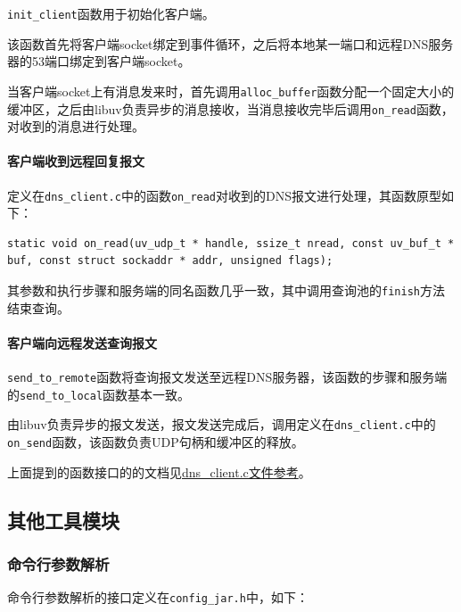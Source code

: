 \documentclass[lang=cn,11pt,a4paper,cite=authornum]{paper}
\begin{document}
\texttt{init_client}函数用于初始化客户端。

该函数首先将客户端socket绑定到事件循环，之后将本地某一端口和远程DNS服务器的53端口绑定到客户端socket。

当客户端socket上有消息发来时，首先调用\texttt{alloc_buffer}函数分配一个固定大小的缓冲区，之后由libuv负责异步的消息接收，当消息接收完毕后调用\texttt{on_read}函数，对收到的消息进行处理。

\paragraph{客户端收到远程回复报文}

定义在\texttt{dns_client.c}中的函数\texttt{on_read}对收到的DNS报文进行处理，其函数原型如下：

\begin{code}
\begin{verbatim}
static void on_read(uv_udp_t * handle, ssize_t nread, const uv_buf_t * buf, const struct sockaddr * addr, unsigned flags);
\end{verbatim}
\end{code}

其参数和执行步骤和服务端的同名函数几乎一致，其中调用查询池的\texttt{finish}方法结束查询。

\paragraph{客户端向远程发送查询报文}

\texttt{send_to_remote}函数将查询报文发送至远程DNS服务器，该函数的步骤和服务端的\texttt{send_to_local}函数基本一致。

由libuv负责异步的报文发送，报文发送完成后，调用定义在\texttt{dns_client.c}中的\texttt{on_send}函数，该函数负责UDP句柄和缓冲区的释放。

上面提到的函数接口的的文档见\href{run:./APIdoc/dns__client_8c.html}{dns\_client.c文件参考}。

\subsection{其他工具模块}

\subsubsection{命令行参数解析}

命令行参数解析的接口定义在\texttt{config_jar.h}中，如下：
\end{document}
